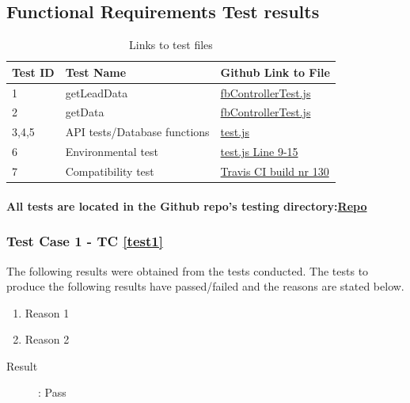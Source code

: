 \documentclass{article}
\begin{document}
\subsection{Functional Requirements Test results}
\begin{table}[H]
\caption{Links to test files}
\label{link_table}
\begin{tabular}{|l|l|l|}
\hline
Test ID    & Test Name   & Github Link to File \\ \hline \hline
1          & getLeadData &  \href{https://github.com/QuintonWeenink/ValknutSolutions/blob/develop/test/fbControllerTest.js}{fbControllerTest.js}         \\ \hline
2          & getData  &  \href{https://github.com/QuintonWeenink/ValknutSolutions/blob/develop/test/fbControllerTest.js}{fbControllerTest.js}       \\ \hline
3,4,5      & API tests/Database functions & \href{https://github.com/QuintonWeenink/ValknutSolutions/blob/develop/test/test.js}{test.js}         \\ \hline
6          &  Environmental test  & \href{https://github.com/QuintonWeenink/ValknutSolutions/blob/develop/test/test.js}{test.js Line 9-15}\\ \hline
7		   & Compatibility test & \href{https://travis-ci.com/QuintonWeenink/ValknutSolutions/builds/30866212}{Travis CI build nr 130} \\ \hline
\end{tabular}
\end{table}
\paragraph{All tests are located in the Github repo's testing directory:\href{https://github.com/QuintonWeenink/ValknutSolutions}{Repo}}


\subsubsection{Test Case 1 - TC \ref{test1}} %
The following results were obtained from the tests conducted. The tests to produce the
following results have passed/failed and the reasons are stated below.
\begin{enumerate}
	\item Reason 1
	\item Reason 2
\end{enumerate}

\begin{description}
	\item [Result]: Pass 
\end{description}
\end{document}
